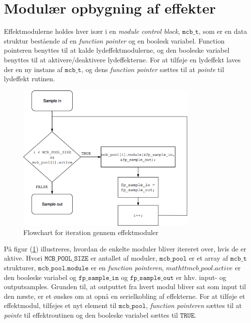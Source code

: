 \section{Modulær opbygning af effekter}
Effektmodulerne holdes hver især i en \textit{module control block}, $\mathtt{mcb\_t}$,  som er en data struktur bestående af en \textit{function pointer} og en boolesk variabel.
Function pointeren benyttes til at kalde lydeffektmodulerne, og den booleske variabel benyttes til at aktivere/deaktivere lydeffekterne.\newline
For at tilføje en lydeffekt laves der en ny instans af $\mathtt{mcb\_t}$, og dens \textit{function pointer} sættes til at \textit{pointe} til lydeffekt rutinen.\newline
\begin{figure}[!ht]
	\centering
	\includegraphics[width=0.8\textwidth]{billeder/Flowchart_for_effektmoduler.png}
	\caption{Flowchart for iteration gennem effektmoduler}
	\label{fig:effektmoduler}
\end{figure}

På figur (\ref{fig:effektmoduler}) illustreres, hvordan de enkelte moduler bliver itereret over, hvis de er aktive.
Hvori $\mathtt{MCB\_POOL\_SIZE}$ er antallet af moduler, $\mathtt{mcb\_pool}$ er et array af $\mathtt{mcb\_t}$ strukturer, $\mathtt{mcb\_pool.module}$ er en \textit{function pointeren}, $mathtt{mcb\_pool.active}$ er den booleske variabel og $\mathtt{fp\_sample\_in}$ og $\mathtt{fp\_sample\_out}$ er hhv. input- og outputsamples.
Grunden til, at outputtet fra hvert modul bliver sat som input til den næste, er et ønskes om at opnå en serielkobling af effekterne.
For at tilføje et effektmodul, tilføjes et nyt element til $\mathtt{mcb\_pool}$, \textit{function pointeren} sættes til at \textit{pointe} til effektroutinen og den booleske variabel sættes til $\mathtt{TRUE}$.

